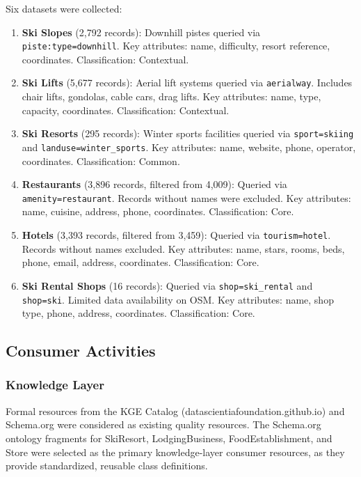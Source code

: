 \noindent Six datasets were collected:

\begin{enumerate}
    \item \textbf{Ski Slopes} (2,792 records): Downhill pistes queried via \texttt{piste:type=downhill}. Key attributes: name, difficulty, resort reference, coordinates. Classification: Contextual.

    \item \textbf{Ski Lifts} (5,677 records): Aerial lift systems queried via \texttt{aerialway}. Includes chair lifts, gondolas, cable cars, drag lifts. Key attributes: name, type, capacity, coordinates. Classification: Contextual.

    \item \textbf{Ski Resorts} (295 records): Winter sports facilities queried via \texttt{sport=skiing} and \texttt{landuse=winter\_sports}. Key attributes: name, website, phone, operator, coordinates. Classification: Common.

    \item \textbf{Restaurants} (3,896 records, filtered from 4,009): Queried via \texttt{amenity=restaurant}. Records without names were excluded. Key attributes: name, cuisine, address, phone, coordinates. Classification: Core.

    \item \textbf{Hotels} (3,393 records, filtered from 3,459): Queried via \texttt{tourism=hotel}. Records without names excluded. Key attributes: name, stars, rooms, beds, phone, email, address, coordinates. Classification: Core.

    \item \textbf{Ski Rental Shops} (16 records): Queried via \texttt{shop=ski\_rental} and \texttt{shop=ski}. Limited data availability on OSM. Key attributes: name, shop type, phone, address, coordinates. Classification: Core.
\end{enumerate}

\subsection{Consumer Activities}

\subsubsection{Knowledge Layer}

Formal resources from the KGE Catalog (datascientiafoundation.github.io) and Schema.org were considered as existing quality resources. The Schema.org ontology fragments for SkiResort, LodgingBusiness, FoodEstablishment, and Store were selected as the primary knowledge-layer consumer resources, as they provide standardized, reusable class definitions.

